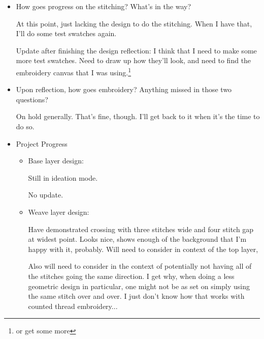 \documentclass[12pt]{article}
\newcommand{\say}[1]{``#1''}
\renewcommand{\,}{\textsuperscript{,}}
\begin{document}
\begin{itemize}
\begin{itemize}
\begin{itemize}
\begin{itemize}
In general, tent stitch or some variation would seem the most sensible.
However, there's also something to be said about the idea of the directionality of the weave or the knot impacting the canvas below.
I think that I'm going to lean towards base layer is just in the one direction, at least as much as is viable given the whole \say{how do I cross lines?} question.
\end{itemize}

These'll be fun questions to draw and then stitch out!

Ope, may need to re-answer the stitch questions again.
I don't think that I'll need a test swatch for each question, but I do think that I will need multiple test swatches.

\item How goes progress on the stitching? What's in the way?

At this point, just lacking the design to do the stitching.
When I have that, I'll do some test swatches again.

Update after finishing the design reflection: I think that I need to make some more test swatches.
Need to draw up how they'll look, and need to find the embroidery canvas that I was using.\footnote{or get some more}

\item Upon reflection, how goes embroidery? Anything missed in those two questions?

On hold generally.
That's fine, though.
I'll get back to it when it's the time to do so.

\item Project Progress

\begin{itemize}

\item Base layer design:

Still in ideation mode.

No update.

\item Weave layer design:

Have demonstrated crossing with three stitches wide and four stitch gap at widest point. Looks nice, shows enough of the background that I'm happy with it, probably.  
Will need to consider in context of the top layer,

Also will need to consider in the context of potentially not having all of the stitches going the same direction.
I get why, when doing a less geometric design in particular, one might not be as set on simply using the same stitch over and over.
I just don't know how that works with counted thread embroidery...


\end{itemize}
\end{itemize}
\end{itemize}
\end{itemize}
\end{document}

